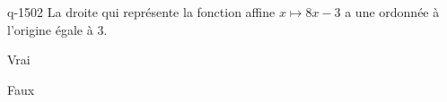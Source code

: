 \begin{truefalse}{q-1502}
La droite qui représente la fonction affine $x\mapsto 8x-3$ a une ordonnée à l'origine égale à $3$.
\item Vrai
\item* Faux
\end{truefalse}

